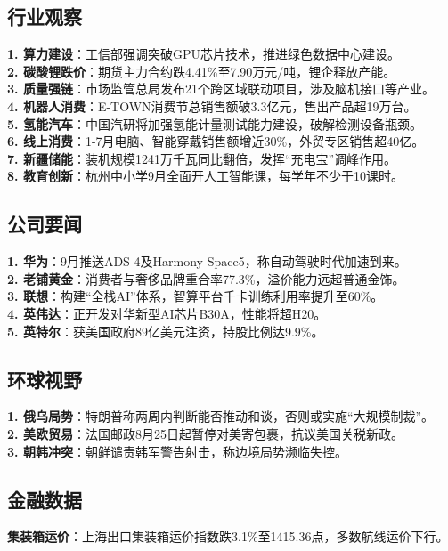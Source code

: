 \subsection{行业观察}
\textbf{1. 算力建设}：工信部强调突破GPU芯片技术，推进绿色数据中心建设。\\
\textbf{2. 碳酸锂跌价}：期货主力合约跌4.41\%至7.90万元/吨，锂企释放产能。\\
\textbf{3. 质量强链}：市场监管总局发布21个跨区域联动项目，涉及脑机接口等产业。\\
\textbf{4. 机器人消费}：E-TOWN消费节总销售额破3.3亿元，售出产品超19万台。\\
\textbf{5. 氢能汽车}：中国汽研将加强氢能计量测试能力建设，破解检测设备瓶颈。\\
\textbf{6. 线上消费}：1-7月电脑、智能穿戴销售额增近30\%，外贸专区销售超40亿。\\
\textbf{7. 新疆储能}：装机规模1241万千瓦同比翻倍，发挥“充电宝”调峰作用。\\
\textbf{8. 教育创新}：杭州中小学9月全面开人工智能课，每学年不少于10课时。

\subsection{公司要闻}
\textbf{1. 华为}：9月推送ADS 4及Harmony Space5，称自动驾驶时代加速到来。\\
\textbf{2. 老铺黄金}：消费者与奢侈品牌重合率77.3\%，溢价能力远超普通金饰。\\
\textbf{3. 联想}：构建“全栈AI”体系，智算平台千卡训练利用率提升至60\%。\\
\textbf{4. 英伟达}：正开发对华新型AI芯片B30A，性能将超H20。\\
\textbf{5. 英特尔}：获美国政府89亿美元注资，持股比例达9.9\%。

\subsection{环球视野}
\textbf{1. 俄乌局势}：特朗普称两周内判断能否推动和谈，否则或实施“大规模制裁”。\\
\textbf{2. 美欧贸易}：法国邮政8月25日起暂停对美寄包裹，抗议美国关税新政。\\
\textbf{3. 朝韩冲突}：朝鲜谴责韩军警告射击，称边境局势濒临失控。

\subsection{金融数据}
\textbf{集装箱运价}：上海出口集装箱运价指数跌3.1\%至1415.36点，多数航线运价下行。





